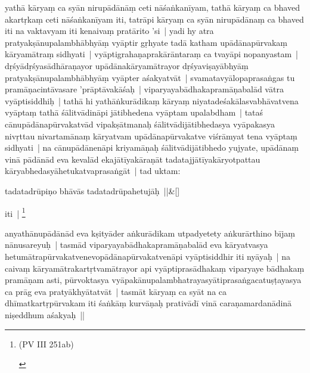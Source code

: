 \documentclass[article,a4paper]{memoir}
\newcommand{\unclear}[1]{($^{?}$#1)}
\begin{document}
	  \pstart {} yathā\- kā\-ryaṃ ca syā\-n nirupā\-dā\-nā\-ṃ ceti nā\-śaṅkanī\-yam, tathā\- kā\-ryaṃ ca bhaved akartṛkaṃ ceti nā\-śaṅkanī\-yam iti, tatrā\-pi kā\-ryaṃ ca syā\-n nirupā\-dā\-naṃ ca bhaved iti na vaktavyam iti kenaivaṃ pratā\-rito 'si | yadi hy atra pratyakṣā\-nupalambhā\-bhyā\-ṃ vyā\-ptir gṛhyate tadā\- katham upā\-dā\-napū\-rvakaṃ kā\-ryamā\-traṃ sidhyati | vyā\-ptigrahaṇaprakā\-rā\-ntaraṃ ca tvayā\-pi nopanyastam | dṛśyā\-dṛśyasā\-dhā\-raṇayor upā\-dā\-nakā\-ryamā\-trayor dṛśyaviṣayā\-bhyā\-ṃ pratyakṣā\-nupalambhā\-bhyā\-ṃ vyā\-pter \edtext{abhyūhitum}{\Afootnote{ \cite{}\unclear{angra}hī\-tum \cite{}}} aśakyatvā\-t | svamatavyā\-lopaprasaṅgas tu pramā\-ṇacintā\-vasare 'prā\-ptā\-vakā\-śaḥ | viparyayabā\-dhakapramā\-ṇabalā\-d vā\-tra vyā\-ptisiddhiḥ | tathā\- hi yathā\-ṅkurā\-dikaṃ kā\-ryaṃ niyatadeśakā\-lasvabhā\-vatvena vyā\-ptaṃ tathā\- śā\-litvā\-dinā\-pi jā\-tibhedena vyā\-ptam upalabdham | tataś cā\-nupā\-dā\-napū\-rvakatvā\-d vipakṣā\-tmanaḥ śā\-litvā\-dijā\-tibhedasya vyā\-pakasya nivṛttau nivartamā\-naṃ kā\-ryatvam upā\-dā\-napū\-rvakatve viśrā\-myat tena vyā\-ptaṃ sidhyati | na cā\-nupā\-dā\-nenā\-pi kriyamā\-ṇaḥ śā\-litvā\-dijā\-tibhedo yujyate, upā\-dā\-naṃ vinā\- pā\-dā\-nā\-d eva kevalā\-d ekajā\-tī\-yakā\-raṇā\-t tadatajjā\-tī\-yakā\-ryotpattau kā\-ryabhedasyā\-hetukatvaprasaṅgā\-t | tad uktam: 
	    \pend
	  
	    
	    \stanza[\smallbreak]
tadatadrū\-piṇo bhā\-vā\-s tadatadrū\-pahetujā\-ḥ ||\&[\smallbreak]


	
	    \pstart
	   iti | \footnote{\begin{english}(PV III 251ab)\end{english}}
	\pend
      

	  \pstart anyathā\-nupā\-dā\-nā\-d eva kṣityā\-der aṅkurā\-dikam utpadyetety aṅkurā\-rthino bī\-jaṃ nā\-nusareyuḥ | tasmā\-d viparyayabā\-dhakapramā\-ṇabalā\-d eva kā\-ryatvasya hetumā\-trapū\-rvakatvenevopā\-dā\-napū\-rvakatvenā\-pi vyā\-ptisiddhir iti nyā\-yaḥ | na caivaṃ kā\-ryamā\-trakartṛtvamā\-trayor api vyā\-ptiprasā\-dhakaṃ viparyaye bā\-dhakaṃ pramā\-ṇam asti, pū\-rvoktasya vyā\-pakā\-nupalambhatrayasyā\-tiprasaṅgacatuṣṭayasya ca prā\-g eva pratyā\-khyā\-tatvā\-t | tasmā\-t kā\-ryaṃ ca syā\-t na ca dhī\-matkartṛpū\-rvakam iti śaṅkā\-ṃ kurvā\-ṇaḥ prativā\-dī\- vinā\- caraṇamardanā\-dinā\- niṣeddhum aśakyaḥ ||
	\pend
      
\end{document}
